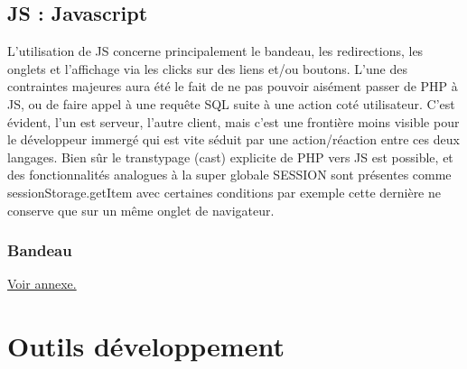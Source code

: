 \documentclass[12pt]{report}
\begin{document}
            \subsection{JS : Javascript} 
\par
L’utilisation de JS concerne principalement le bandeau, les redirections, les onglets et l’affichage via les clicks sur des liens et/ou boutons. L’une des contraintes majeures aura été le fait de ne pas pouvoir aisément passer de PHP à JS, ou de faire appel à une requête SQL suite à une action coté utilisateur. C’est évident, l’un est serveur, l’autre client, mais c’est une frontière moins visible pour le développeur immergé qui est vite séduit par une action/réaction entre ces deux langages. Bien sûr le transtypage (cast) explicite de PHP vers JS est possible, et des fonctionnalités analogues à la super globale SESSION sont présentes comme sessionStorage.getItem avec certaines conditions par exemple cette dernière ne conserve que sur un même onglet de navigateur.
        \subsubsection{Bandeau}
\par
\hypertarget{retour-bandeau}{}
\hyperlink{annexe-bandeau}{Voir annexe.}
\newpage
        \section{Outils développement}
\end{document}
